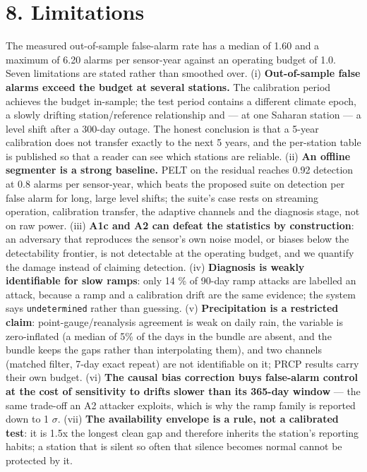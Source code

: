\documentclass[10pt,a4paper]{article}
\begin{document}
\section*{8. Limitations}
The measured out-\allowbreak{}of-\allowbreak{}sample false-\allowbreak{}alarm rate has a median of 1.60 and a maximum of 6.20 alarms per sensor-\allowbreak{}year against an operating budget of 1.0. Seven limitations are stated rather than smoothed over. (i) \textbf{Out-\allowbreak{}of-\allowbreak{}sample false alarms exceed the budget at several stations.} The calibration period achieves the budget in-\allowbreak{}sample; the test period contains a different climate epoch, a slowly drifting station/\allowbreak{}reference relationship and — at one Saharan station — a level shift after a 300-\allowbreak{}day outage. The honest conclusion is that a 5-\allowbreak{}year calibration does not transfer exactly to the next 5 years, and the per-\allowbreak{}station table is published so that a reader can see which stations are reliable. (ii) \textbf{An offline segmenter is a strong baseline.} PELT on the residual reaches 0.92 detection at 0.8 alarms per sensor-\allowbreak{}year, which beats the proposed suite on detection per false alarm for long, large level shifts; the suite's case rests on streaming operation, calibration transfer, the adaptive channels and the diagnosis stage, not on raw power. (iii) \textbf{A1c and A2 can defeat the statistics by construction}: an adversary that reproduces the sensor's own noise model, or biases below the detectability frontier, is not detectable at the operating budget, and we quantify the damage instead of claiming detection. (iv) \textbf{Diagnosis is weakly identifiable for slow ramps}: only 14 \% of 90-\allowbreak{}day ramp attacks are labelled an attack, because a ramp and a calibration drift are the same evidence; the system says \texttt{undetermined} rather than guessing. (v) \textbf{Precipitation is a restricted claim}: point-\allowbreak{}gauge/\allowbreak{}reanalysis agreement is weak on daily rain, the variable is zero-\allowbreak{}inflated (a median of 5\% of the days in the bundle are absent, and the bundle keeps the gaps rather than interpolating them), and two channels (matched filter, 7-\allowbreak{}day exact repeat) are not identifiable on it; PRCP results carry their own budget. (vi) \textbf{The causal bias correction buys false-\allowbreak{}alarm control at the cost of sensitivity to drifts slower than its 365-\allowbreak{}day window} — the same trade-\allowbreak{}off an A2 attacker exploits, which is why the ramp family is reported down to 1 $\sigma$. (vii) \textbf{The availability envelope is a rule, not a calibrated test}: it is 1.5x the longest clean gap and therefore inherits the station's reporting habits; a station that is silent so often that silence becomes normal cannot be protected by it.
\end{document}
